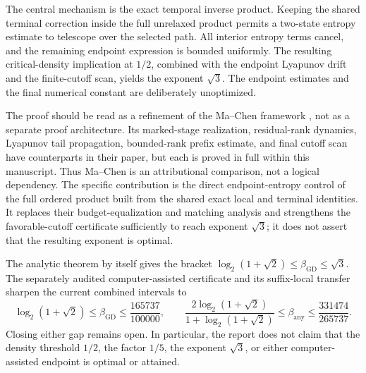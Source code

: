 \documentclass[11pt]{article}
\theoremstyle{definition}
\theoremstyle{remark}
\newcommand{\gdexp}{\beta_{\mathrm{GD}}}
\newcommand{\anyexp}{\beta_{\mathrm{any}}}
\begin{document}
The central mechanism is the exact temporal inverse product.  Keeping the
shared terminal correction inside the full unrelaxed product permits a
two-state entropy estimate to telescope over the selected path.  All
interior entropy terms cancel, and the
remaining endpoint expression is bounded uniformly.  The resulting
critical-density implication at \(1/2\), combined with the endpoint
Lyapunov drift and the finite-cutoff scan, yields the exponent \(\sqrt3\).
The endpoint estimates and the final numerical constant are deliberately
unoptimized.

The proof should be read as a refinement of the Ma--Chen framework
\cite{machen2026}, not as a separate proof architecture.  Its marked-stage
realization, residual-rank dynamics, Lyapunov tail propagation, bounded-rank
prefix estimate, and final cutoff scan have counterparts in their paper, but
each is proved in full within this manuscript.  Thus Ma--Chen is an
attributional comparison, not a logical dependency.  The specific
contribution is the direct endpoint-entropy control of the full ordered
product built from the shared exact local and terminal identities.  It
replaces their budget-equalization and matching analysis and strengthens the
favorable-cutoff certificate sufficiently to reach exponent \(\sqrt3\); it
does not assert that the resulting exponent is optimal.

The analytic theorem by itself gives the bracket
\(\log_2(1+\sqrt2)\le\gdexp\le\sqrt3\).  The separately audited
computer-assisted certificate and its suffix-local transfer sharpen the
current combined intervals to
\[
 \log_2(1+\sqrt2)
 \le \gdexp
 \le\frac{165737}{100000},
 \qquad
 \frac{2\log_2(1+\sqrt2)}{1+\log_2(1+\sqrt2)}
 \le\anyexp
 \le\frac{331474}{265737}.
\]
Closing either gap remains open.  In particular, the report does not claim
that the density threshold \(1/2\), the factor \(1/5\), the exponent
\(\sqrt3\), or either computer-assisted endpoint is optimal or attained.
\end{document}
